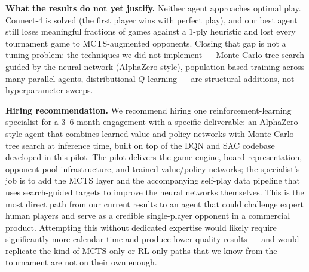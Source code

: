 \documentclass[11pt]{article}
\begin{document}
\textbf{What the results do not yet justify.} Neither agent
approaches optimal play. Connect-4 is solved (the first player wins
with perfect play), and our best agent still loses meaningful
fractions of games against a $1$-ply heuristic and lost every
tournament game to MCTS-augmented opponents. Closing that gap is not
a tuning problem: the techniques we did not implement --- Monte-Carlo
tree search guided by the neural network (AlphaZero-style),
population-based training across many parallel agents, distributional
$Q$-learning --- are structural additions, not hyperparameter sweeps.

\textbf{Hiring recommendation.} We recommend hiring one
reinforcement-learning specialist for a 3--6 month engagement with a
specific deliverable: an AlphaZero-style agent that combines learned
value and policy networks with Monte-Carlo tree search at inference
time, built on top of the DQN and SAC codebase developed in this
pilot. The pilot delivers the game engine, board representation,
opponent-pool infrastructure, and trained value/policy networks; the
specialist's job is to add the MCTS layer and the accompanying
self-play data pipeline that uses search-guided targets to improve
the neural networks themselves. This is the most direct path from
our current results to an agent that could challenge expert human
players and serve as a credible single-player opponent in a
commercial product. Attempting this without dedicated expertise would
likely require significantly more calendar time and produce
lower-quality results --- and would replicate the kind of MCTS-only
or RL-only paths that we know from the tournament are not on their
own enough.
\end{document}
